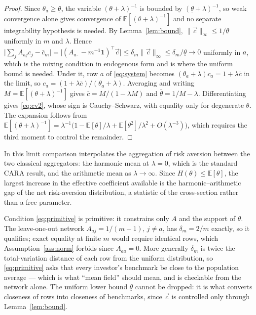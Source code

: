 \documentclass[12pt]{article}
\theoremstyle{definition}
\theoremstyle{remark}
\newcommand{\E}{\mathbb{E}}
\newcommand{\bth}{\bar\theta}
\begin{document}
\begin{proof}
Since $\theta_a\geq\underline\theta$, the variable $(\theta+\lambda)^{-1}$ is
bounded by $(\underline\theta+\lambda)^{-1}$, so weak convergence alone gives
convergence of $\E[(\theta+\lambda)^{-1}]$ and no separate integrability
hypothesis is needed. By Lemma~\ref{lem:bound},
$\|\vec c\|_\infty\leq1/\underline\theta$ uniformly in $m$ and $\lambda$. Hence
$\big|\sum_jA_{aj}c_j-\bar c_m\big|
=\big|(A_{a\cdot}-m^{-1}\mathbf 1)^{\top}\vec c\big|
\leq\delta_m\|\vec c\|_\infty\leq\delta_m/\underline\theta\to0$
uniformly in $a$, which is the mixing condition in endogenous form and is where
the uniform bound is needed. Under it, row $a$ of \eqref{eq:system} becomes
$(\theta_a+\lambda)c_a=1+\lambda\bar c$ in the limit, so
$c_a=(1+\lambda\bar c)/(\theta_a+\lambda)$. Averaging and writing
$M=\E[(\theta+\lambda)^{-1}]$ gives $\bar c=M/(1-\lambda M)$ and
$\bth=1/M-\lambda$. Differentiating gives \eqref{eq:cv2}, whose sign is
Cauchy--Schwarz, with equality only for degenerate $\theta$. The expansion
follows from
$\E[(\theta+\lambda)^{-1}]
=\lambda^{-1}\big(1-\E[\theta]/\lambda+\E[\theta^{2}]/\lambda^{2}
+O(\lambda^{-3})\big)$, which requires the third moment to control the
remainder.
\end{proof}

In this limit comparison interpolates the aggregation of risk aversion between
the two classical aggregators: the harmonic mean at $\lambda=0$, which is the
standard CARA result, and the arithmetic mean as $\lambda\to\infty$. Since
$H(\theta)\leq\E[\theta]$, the largest increase in the effective coefficient
available is the harmonic--arithmetic gap of the net risk-aversion
distribution, a
statistic of the cross-section rather than a free parameter.

Condition \eqref{eq:primitive} is primitive: it constrains only $A$ and the
support of $\theta$. The leave-one-out network $A_{aj}=1/(m-1)$, $j\neq a$, has
$\delta_m=2/m$ exactly, so it qualifies; exact equality at finite $m$ would
require identical rows, which Assumption~\ref{ass:norm} forbids since
$A_{aa}=0$. More generally $\delta_m$ is twice the total-variation distance of
each row from the uniform distribution, so \eqref{eq:primitive} asks that every
investor's benchmark be close to the population average --- which is what
``mean field'' should mean, and is checkable from the network alone. The uniform
lower bound $\underline\theta$ cannot be dropped: it is what converts closeness
of rows into closeness of benchmarks, since $\vec c$ is controlled only through
Lemma~\ref{lem:bound}.
\end{document}
